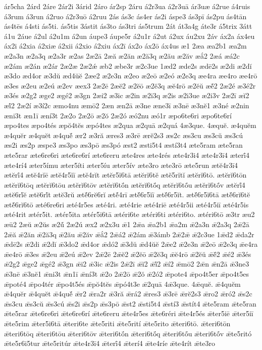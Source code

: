 {ár5cha
2árd
2áre
2ár2i
3árid
2áro
ár2sp
2áru
á2r3ua
á2r3uā
ár3uæ
á2rue
á4ruis
á3rum
á3run
á2ruo
á2r3uō
á2ruu
2ás
ás3c
ás4er
ás2i
áspe3
ás3pī
ás2pu
ás4tān
ás4tēs
á4sti
ás5ti.
ás5tis
3ástit
ás3to
ás3tri
ás5trum
2át
át3a4g
áte3r
á5trix
3átt
á1u
2áue
á2ul
á2u1m
á2un
áupe3
áupe5r
á2u1r
á2ut
á2ux
áu2xu
2áv
áx2a
áx4eu
áx2i
á2xia
á2xiæ
á2xii
á2xio
á2xiu
áx2ī
áx2o
áx2ō
áx4us
æ1
2æa
æa2b1
æa2m
æ2a3n
æ2a3q
æ2a3r
æ2as
2æ2ā
2æă
æ2ăn
æ2ă3q
æ2ău
æ2ăv
æắ2
2æá
æá2c
æ2ám
æ2án
æ2ár
2æ2æ
2æ2ǽ
æb2
æbe3r
æ2c3ue
1æd2
æde2s
ædē2s
æ2di
æ2dĭ
æ3do
æd4or
æ3dŭ
æd4ŭĕ
2æe2
æ2e3n
æ2eo
æ2eō
æ2eó
æ2e3q
æe4ra
æe4ro
æe4rō
æ3es
æ2eu
æ2eú
æ2ev
æex3
2æ2ē
2æĕ2
æ2ĕō
æ2ĕ3q
æĕ4rō
æ2ĕŭ
æĕ́2
2æ2é
æ3é2r
æ3és
æ2g2
æge2
ægé2
æ3gn
2æi2
æ3ic
æ2in
æ2i3q
æ2is
æ2i3ue
æ2i3v
2æ2ī
æĭ2
æĭ́2
2æ2í
æ3í2c
æmo4nu
æmō2
2æn
æn2ā
æ3ne
æne3ī
æ3nē
æ3nĕ1
æ3né
æ2nin
æni3t
æn1ī
æní3t
2æ2o
2æ2ō
æ2ŏ
2æ2ó
æó2nu
æó1r
æpo6te6ri
æpo6te6rí
æpo4tes
æpo4tés
æpŏ4tĕs
æpó4tes
æ2qua
æ2quā
æ2quá
4æ3que.
4æquĕ.
æ4quĕm
æ4quĕr
æ4quĕt
æ4quĕ́
ær2
æ3ră
æres3
æ3rē
ærĕ2s3
æs2c
æs3cu
æs3cŭ
æs3cú
æs2i
æs2p
æspe3
æs3po
æs3pō
æs3pó
æst2
æsti5t4
æstí3t4
æte5ram
æte5ran
æte5rar
æte6re6ri
æte6re6rí
æte6reru
æte4res
æte4rés
æte4r3i4
æte4r3ī4
æterī́4
æte4rí4
æter5ímu
æter5íti
æter5íu
æter5ív
æte3ro
æte3rō
æte5run
ætĕ4r3ī4
ætĕrī́4
ætĕ4rĭē
ætĕ4r5ĭī
ætĕ4rĭt
ætĕr5ĭ6tā
ætĕrĭ6tĕ
ætĕ5rĭtĭ
ætĕrĭ6tō.
ætĕrĭ6tōn
ætĕrĭ6tōq
ætĕrĭ6tōu
ætĕrĭ6tōv
ætĕrĭ6tṓn
ætĕrĭ6tṓq
ætĕrĭ6tṓu
ætĕrĭ6tṓv
ætĕrĭ́4
ætĕ6rĭ́ĕ
ætĕ6rĭ́t
ætĕ3rŭ
ætĕ́6rĕ6rĭ
ætĕ́4rī
ætĕ́6r5ĭī
ætĕ́6r5ĭt.
ætĕ́6r5ĭ6tā
ætĕ́6rĭ6tĕ
ætĕ́6rĭ6tō
æté6re6ri
æté4r5es
æté4ri.
æté4rie
æté4riē
æté4r5ii
æté4r5iī
æté4r5is
æté4rit
ætér5it.
ætér5ita
ætér5i6tā
ætéri6te
ætéri6ti
ætéri6to.
ætéri6tō
æ3tr
æu2
æū2
2æŭ
æ2ŭs
æ2ŭ́
2æ2ú
æx2
æ2x3u
ǣ1
2ǣa
ǣa2b1
ǣa2m
ǣ2a3n
ǣ2a3q
2ǣ2ā
2ǣă
ǣ2ăn
ǣ2ă3q
ǣ2ău
ǣ2ăv
ǣắ2
2ǣá2
ǣ2ám
ǣ3ámb
2ǣ2ǣ
ǣ2c3ue
1ǣd2
ǣda2r
ǣdē2s
ǣ2di
ǣ2dĭ
ǣ3do2
ǣd4or
ǣdó2
ǣ3dŭ
ǣd4ŭĕ
2ǣe2
ǣ2e3n
ǣ2eō
ǣ2e3q
ǣe4ra
ǣe4rō
ǣ3es
ǣ2eu
ǣ2eú
ǣ2ev
2ǣ2ē
2ǣĕ2
ǣ2ĕō
ǣ2ĕ3q
ǣĕ4rō
ǣ2ĕŭ
ǣĕ́2
ǣé2
ǣ3és
ǣ2g2
ǣge2
ǣgé2
ǣ3gn
ǣi2
ǣ3ic
ǣ2is
2ǣ2ī
ǣĭ2
ǣĭ́2
ǣí2
ǣmō2
2ǣn
ǣn2ā
ǣ3ne3
ǣ3nē
ǣ3nĕ1
ǣni3t
ǣn1ī
ǣní3t
ǣ2o
2ǣ2ō
ǣ2ŏ
ǣ2ó2
ǣpote4
ǣpo4t5er
ǣpo4t5es
ǣpoté4
ǣpo4tér
ǣpo4t5és
ǣpŏ4tĕs
ǣpó4t3e
ǣ2quā
4ǣ3que.
4ǣquĕ.
ǣ4quĕm
ǣ4quĕr
ǣ4quĕt
ǣ4quĕ́
ǣr2
ǣra2r
ǣ3ră
ǣrá2
ǣres3
ǣ3rē
ǣrĕ2s3
ǣro2
ǣró2
ǣs2c
ǣs3cu
ǣs3cŭ
ǣs3cú
ǣs2i
ǣs2p
ǣs3pō
ǣst2
ǣsti5t4
ǣstí3
ǣstít4
ǣte5ram
ǣte5ran
ǣte5rar
ǣte6re6ri
ǣte6re6rí
ǣte6reru
ǣte4r5es
ǣte6réri
ǣte4r5és
ǣter5iē
ǣter5iī
ǣte5rim
ǣter5i6tā
ǣteri6te
ǣte5riti
ǣte5rití
ǣte5rito
ǣteri6tō.
ǣteri6tōn
ǣteri6tōq
ǣteri6tōu
ǣteri6tōv
ǣteri6tṓn
ǣteri6tṓq
ǣteri6tṓu
ǣteri6tṓv
ǣte5ritó
ǣte5r6i5tur
ǣte5ritúr
ǣte4r3ī4
ǣterī́4
ǣterí4
ǣte4ríe
ǣte4rít
ǣte3ro
}
